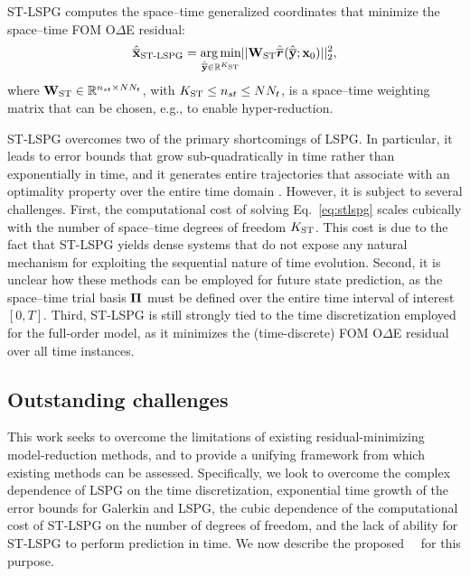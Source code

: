 \documentclass[3p,computermodern,10pt]{elsarticle}
\begin{document}
ST-LSPG computes the space--time generalized coordinates that
minimize the space--time FOM O$\Delta$E residual:
\begin{equation}\label{eq:stlspg}
	\hat{\mathbf{\overline{x}}}_\text{ST-LSPG} = \underset{ \hat{\mathbf{\overline{y}}}\in\mathbb{R}^{K_{\text{ST}}} }{\text{arg\,min}}|| \mathbf{W}_{\text{ST}}  \hat{\overline{\boldsymbol r}}_{\text{}}(\hat{\mathbf{\overline{y}}};{{\mathbf{x}}_0}) ||_2^2, 
\end{equation}
where $\mathbf{W}_{\text{ST}} \in \mathbb{R}^{n_{st} \times N N_t}$, with $K_{\text{ST}}
\le n_{st} \le N N_t$, is a space--time weighting matrix that can be chosen,
e.g., to enable hyper-reduction.

ST-LSPG overcomes two of the primary shortcomings of LSPG. In particular, it
leads to error bounds that grow sub-quadratically in time rather than
exponentially in time, and it generates entire trajectories that associate
with an optimality property over the entire time domain \cite{choi_stlspg}.
However, it is subject to several challenges. First, the computational cost of
solving Eq.~\eqref{eq:stlspg} scales cubically with the number of space--time
degrees of freedom $K_{\text{ST}}$. This cost is due to the fact that ST-LSPG yields 
dense systems that do not expose any natural mechanism for exploiting
the sequential nature of time evolution. Second, it is unclear how these
methods can be employed for future state prediction, as the space--time trial
basis $\boldsymbol \Pi$ must be defined over the entire time interval of interest
$[0,T]$. Third, ST-LSPG is still strongly tied to the time discretization
employed for the full-order model, as it minimizes the (time-discrete) FOM
O$\Delta$E residual over all time instances.
  
\subsection{Outstanding challenges}
This work seeks to overcome the limitations of existing residual-minimizing
model-reduction methods, and to provide a unifying framework from which
existing methods can be assessed. Specifically, we look to overcome the
complex dependence of LSPG on the time discretization,
exponential time growth of the error bounds for Galerkin and LSPG,
the cubic dependence of the computational cost of ST-LSPG on the number of
degrees of freedom, and the lack of ability for ST-LSPG to perform prediction
in time. We now describe the proposed \methodNameLower\ \approachKwd\ for this
purpose. 
%
\end{document}
